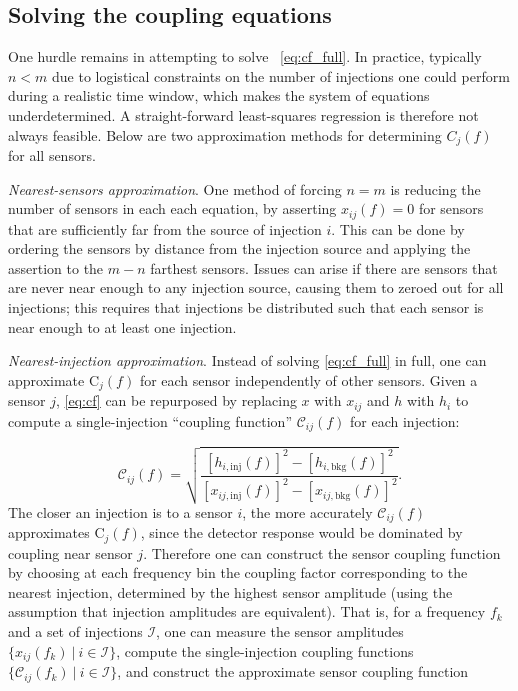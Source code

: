 \subsection{Solving the coupling equations}

One hurdle remains in attempting to solve ~\cref{eq:cf_full}.
In practice, typically $n<m$ due to logistical constraints on the number of injections one could perform during a realistic time window, which makes the system of equations underdetermined.
A straight-forward least-squares regression is therefore not always feasible.
Below are two approximation methods for determining $C_j(f)$ for all sensors.

\textit{Nearest-sensors approximation}.
One method of forcing $n=m$ is reducing the number of sensors in each each equation, by asserting $x_{ij}(f)=0$ for sensors that are sufficiently far from the source of injection $i$.
This can be done by ordering the sensors by distance from the injection source and applying the assertion to the $m-n$ farthest sensors.
Issues can arise if there are sensors that are never near enough to any injection source, causing them to zeroed out for all injections; this requires that injections be distributed such that each sensor is near enough to at least one injection.

\textit{Nearest-injection approximation}.
Instead of solving \cref{eq:cf_full} in full, one can approximate $\mathrm{C}_j(f)$ for each sensor independently of other sensors.
Given a sensor $j$, \cref{eq:cf} can be repurposed by replacing $x$ with $x_{ij}$ and $h$ with $h_i$ to compute a single-injection ``coupling function'' $\mathcal{C}_{ij}(f)$ for each injection:

\begin{equation}\label{eq:sicf}
	\mathcal{C}_{ij}(f) = \sqrt{\frac{[h_{i,\textrm{inj}}(f)]^2 - [h_{i,\textrm{bkg}}(f)]^2}{[x_{ij,\textrm{inj}}(f)]^2 - [x_{ij,\textrm{bkg}}(f)]^2}}.
\end{equation}
The closer an injection is to a sensor $i$, the more accurately $\mathcal{C}_{ij}(f)$ approximates $\mathrm{C}_j(f)$, since the detector response would be dominated by coupling near sensor $j$.
Therefore one can construct the sensor coupling function by choosing at each frequency bin the coupling factor corresponding to the nearest injection, determined by the highest sensor amplitude (using the assumption that injection amplitudes are equivalent).
That is, for a frequency $f_k$ and a set of injections $\mathcal{I}$, one can measure the sensor amplitudes $\{x_{ij}(f_k)\ |\ i \in \mathcal{I}\}$, compute the single-injection coupling functions $\{\mathcal{C}_{ij}(f_k)\ |\ i \in \mathcal{I}\}$, and construct the approximate sensor coupling function

